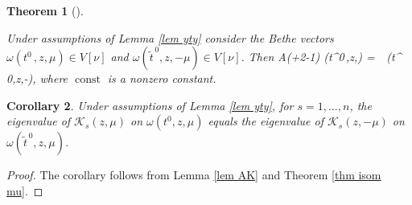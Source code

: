 \documentclass[12pt]{amsart}
\newtheorem{thm}{Theorem}[section]
\newtheorem{cor}[thm]{Corollary}
\numberwithin{equation}{section}
\theoremstyle{definition}
\let\mc\mathcal
\let\om\omega
\let\ox\otimes
\let\on\operatorname
\def\C{{\mathbb C}}
\def\K{{\mc K}}
\def\const{\on{const}}
\begin{document}
\begin{thm}
[{\cite[Theorem 5.7]{MV2}}]
\label{thm WB}

 Under assumptions of Lemma \ref{lem yty} consider 
the Bethe vectors  $\om(t^0\,,z, \mu) \in V[\nu]$ and
 $\om(\tilde t^{\,0}\!,z,-\mu) \in V[\nu]$.  Then
 \bean
 \label{BVA}
\mc A\Big(\mu +\frac {\nu}2-1\Big)
\om(t^0\,,z,\mu) =\, \const\,
\om(\tilde t^{\,0}\!,z,-\mu),
\eean
where $\const$ is a nonzero constant.


\end{thm}

\begin{cor}
\label{cor =eig}
 Under assumptions of Lemma \ref{lem yty}, for $s=1,\dots,n$,
 the eigenvalue of $\K_s(z,\mu)$ on $\om(t^0\!,z,\mu)$ equals 
 the eigenvalue of $\K_s(z,-\mu)$ on $\om(\tilde t^{\,0}\!,z,\mu)$.
\end{cor}

\begin{proof}
The corollary follows from Lemma \ref{lem AK} and Theorem \ref{thm isom mu}.
\end{proof}










\end{document}
